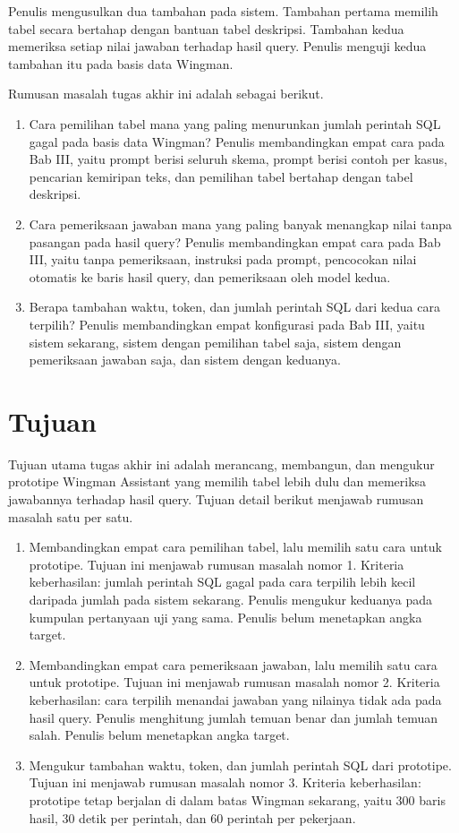 Penulis mengusulkan dua tambahan pada sistem. Tambahan pertama memilih tabel secara bertahap dengan bantuan tabel deskripsi. Tambahan kedua memeriksa setiap nilai jawaban terhadap hasil query. Penulis menguji kedua tambahan itu pada basis data Wingman.

Rumusan masalah tugas akhir ini adalah sebagai berikut.
\begin{enumerate}
\item	Cara pemilihan tabel mana yang paling menurunkan jumlah perintah SQL gagal pada basis data Wingman? Penulis membandingkan empat cara pada Bab III, yaitu prompt berisi seluruh skema, prompt berisi contoh per kasus, pencarian kemiripan teks, dan pemilihan tabel bertahap dengan tabel deskripsi.
\item	Cara pemeriksaan jawaban mana yang paling banyak menangkap nilai tanpa pasangan pada hasil query? Penulis membandingkan empat cara pada Bab III, yaitu tanpa pemeriksaan, instruksi pada prompt, pencocokan nilai otomatis ke baris hasil query, dan pemeriksaan oleh model kedua.
\item	Berapa tambahan waktu, token, dan jumlah perintah SQL dari kedua cara terpilih? Penulis membandingkan empat konfigurasi pada Bab III, yaitu sistem sekarang, sistem dengan pemilihan tabel saja, sistem dengan pemeriksaan jawaban saja, dan sistem dengan keduanya.
\end{enumerate}

\section{Tujuan}
Tujuan utama tugas akhir ini adalah merancang, membangun, dan mengukur prototipe Wingman Assistant yang memilih tabel lebih dulu dan memeriksa jawabannya terhadap hasil query. Tujuan detail berikut menjawab rumusan masalah satu per satu.
\begin{enumerate}
\item	Membandingkan empat cara pemilihan tabel, lalu memilih satu cara untuk prototipe. Tujuan ini menjawab rumusan masalah nomor 1. Kriteria keberhasilan: jumlah perintah SQL gagal pada cara terpilih lebih kecil daripada jumlah pada sistem sekarang. Penulis mengukur keduanya pada kumpulan pertanyaan uji yang sama. Penulis belum menetapkan angka target.
\item	Membandingkan empat cara pemeriksaan jawaban, lalu memilih satu cara untuk prototipe. Tujuan ini menjawab rumusan masalah nomor 2. Kriteria keberhasilan: cara terpilih menandai jawaban yang nilainya tidak ada pada hasil query. Penulis menghitung jumlah temuan benar dan jumlah temuan salah. Penulis belum menetapkan angka target.
\item	Mengukur tambahan waktu, token, dan jumlah perintah SQL dari prototipe. Tujuan ini menjawab rumusan masalah nomor 3. Kriteria keberhasilan: prototipe tetap berjalan di dalam batas Wingman sekarang, yaitu 300 baris hasil, 30 detik per perintah, dan 60 perintah per pekerjaan.
\end{enumerate}

